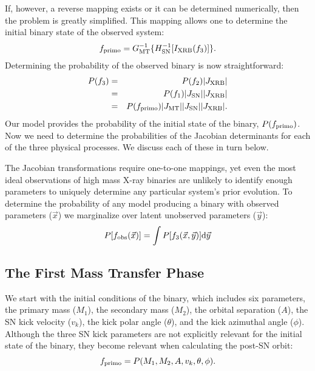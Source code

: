 \documentclass[12pt, preprint]{aastex}
\newcommand{\dd}{\mathrm{d}}
\begin{document}
If, however, a reverse mapping exists or it can be determined numerically, then the problem is greatly simplified. This mapping allows one to determine the initial binary state of the observed system:
\begin{equation}
f_{\rm primo} = G_{\rm MT}^{-1} \{ H_{\rm SN}^{-1} [ I_{\rm XRB} (f_3) ] \}.
\end{equation}
Determining the probability of the observed binary is now straightforward:
\begin{eqnarray}
P(f_3) &=& P(f_2) | J_{\rm XRB} | \\
  &=& P(f_1) | J_{\rm SN} | | J_{\rm XRB} | \\
  &=& P(f_{\rm primo}) | J_{\rm MT} | | J_{\rm SN} | | J_{\rm XRB} |.
\end{eqnarray}
Our model provides the probability of the initial state of the binary, $P(f_{\rm primo})$. Now we need to determine the probabilities of the Jacobian determinants for each of the three physical processes. We discuss each of these in turn below.


The Jacobian transformations require one-to-one mappings, yet even the most ideal observations of high mass X-ray binaries are unlikely to identify enough parameters to uniquely determine any particular system's prior evolution. To determine the probability of any model producing a binary with observed parameters ($\vec{x}$) we marginalize over latent unobserved parameters ($\vec{y}$):
\begin{equation}
P[f_{\rm obs}(\vec{x})] = \int P[f_3(\vec{x}, \vec{y})] \dd \vec{y}
\end{equation}





\subsection{The First Mass Transfer Phase}

We start with the initial conditions of the binary, which includes six parameters, the primary mass ($M_1$), the secondary mass ($M_2$), the orbital separation ($A$), the SN kick velocity ($v_k$), the kick polar angle ($\theta$), and the kick azimuthal angle ($\phi$). Although the three SN kick parameters are not explicitly relevant for the initial state of the binary, they become relevant when calculating the post-SN orbit:
\begin{equation}
f_{\rm primo} = P(M_1, M_2, A, v_k, \theta, \phi).
\end{equation}
\end{document}
